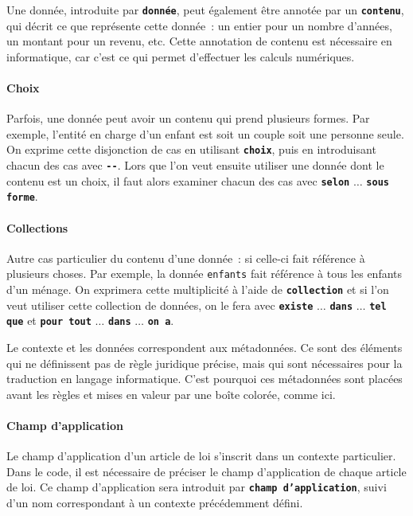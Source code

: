 \documentclass[12pt, french]{article}
\newcommand{\kw}[1]{\textbf{\textcolor{OliveGreen}{#1}}}
\newcommand{\inlinekw}[1]{\kw{\texttt{#1}}}
\newenvironment{metadata}{
  \begin{tcolorbox}[colframe=OliveGreen, title=\textcolor{black}{\texttt{Métadonnées}}, before skip=1em, after skip=1em]
}{
\end{tcolorbox}
}
\begin{document}
Une donnée, introduite par \inlinekw{donnée}, peut également être annotée par un \inlinekw{contenu}, qui décrit ce que représente cette donnée : un entier pour un nombre d’années, un montant pour un revenu, etc. Cette annotation de contenu est nécessaire en informatique, car c’est ce qui permet d’effectuer les calculs numériques.

\paragraph{Choix} Parfois, une donnée peut avoir un contenu qui prend plusieurs formes. Par exemple, l’entité en charge d’un enfant est soit un couple soit une personne seule. On exprime cette disjonction de cas en utilisant \inlinekw{choix}, puis en introduisant chacun des cas avec \inlinekw{-}\inlinekw{-}. Lors que l’on veut ensuite utiliser une donnée dont le contenu est un choix, il faut alors examiner chacun des cas avec \inlinekw{selon} $\ldots$ \inlinekw{sous forme}.

\paragraph{Collections} Autre cas particulier du contenu d’une donnée : si celle-ci fait référence à plusieurs choses. Par exemple, la donnée \texttt{enfants} fait référence à tous les enfants d’un ménage. On exprimera cette multiplicité à l’aide de \inlinekw{collection} et si l’on veut utiliser cette collection de données, on le fera avec \inlinekw{existe} $\ldots$ \inlinekw{dans} $\ldots$ \inlinekw{tel que} et \inlinekw{pour tout} $\ldots$ \inlinekw{dans} $\ldots$ \inlinekw{on a}.

\begin{metadata}
  Le contexte et les données correspondent aux métadonnées. Ce sont des éléments qui ne définissent pas de règle juridique précise, mais qui sont nécessaires pour la traduction en langage informatique. C’est pourquoi ces métadonnées sont placées avant les règles et mises en valeur par une boîte colorée, comme ici.
\end{metadata}


\paragraph{Champ d’application} Le champ d’application d’un article de loi s’inscrit dans un contexte particulier. Dans le code, il est nécessaire de préciser le champ d’application de chaque article de loi. Ce champ d’application sera introduit par \inlinekw{champ d’application}, suivi d’un nom correspondant à un contexte précédemment défini.
\end{document}
